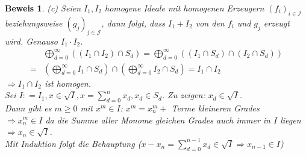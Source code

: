 \documentclass[a4paper,12pt]{report}
\theoremstyle{break}
\theoremstyle{nonumberbreak}
\theoremstyle{nonumberplain}
\newtheorem{Bew}{Beweis}
\newcommand{\defeqr}[0]{\mathrel{\mathop:}=}
\begin{document}
\begin{Bew}
  (c) Seien $I_1,I_2$ homogene Ideale mit homogenen Erzeugern $(f_i)_{i\in \mathcal I}$ beziehungsweise
    $(g_j)_{j\in \mathcal J}$, dann folgt, dass $I_1+I_2$ von den $f_i$ und $g_j$ erzeugt wird. Genauso $I_1\cdot I_2$. \\
    \begin{align*}
      & \bigoplus_{d=0}^\infty((I_1\cap I_2)\cap S_d)=\bigoplus_{d=0}^\infty((I_1\cap S_d)\cap (I_2\cap S_d)) \\
      = & \left(\bigoplus_{d=0}^\infty I_1\cap S_d\right)\cap \left(\bigoplus_{d=0}^\infty I_2\cap S_d\right)=I_1\cap I_2
    \end{align*}
    $\Rightarrow I_1\cap I_2$ ist homogen.\\
    Sei $I\defeqr I_1, x\in\sqrt{I},x=\sum_{d=0}^nx_d,x_d\in S_d$. Zu zeigen: $x_d\in\sqrt{I}$.\\
    Dann gibt es $m\geq 0$ mit $x^m\in I$: $x^m=x_n^m+$ Terme kleineren Grades \\
    $\Rightarrow x_n^m\in I$ da die Summe aller Monome gleichen Grades auch immer in $I$ liegen $\Rightarrow x_n\in\sqrt{I}$.\\
Mit Induktion folgt die Behauptung ($x-x_n=\sum_{d=0}^{n-1}x_d\in\sqrt{I}\Rightarrow x_{n-1}\in I$)
 \end{Bew}
\end{document}
